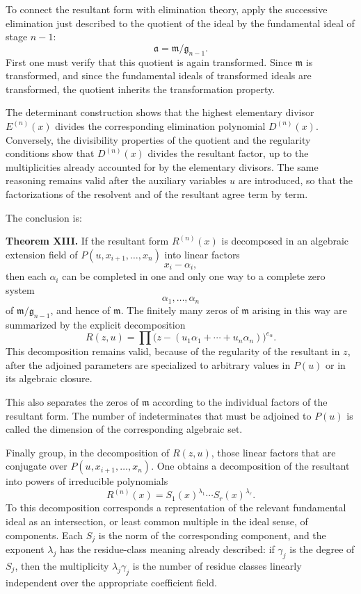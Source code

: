 \documentclass[12pt]{article}
\begin{document}
To connect the resultant form with elimination theory, apply the successive elimination just described to the quotient of the ideal by the fundamental ideal of stage $n-1$:
\[
  \mathfrak a=\mathfrak m/\mathfrak g_{n-1}.
\]
First one must verify that this quotient is again transformed. Since $\mathfrak m$ is transformed, and since the fundamental ideals of transformed ideals are transformed, the quotient inherits the transformation property.

The determinant construction shows that the highest elementary divisor $E^{(n)}(x)$ divides the corresponding elimination polynomial $D^{(n)}(x)$. Conversely, the divisibility properties of the quotient and the regularity conditions show that $D^{(n)}(x)$ divides the resultant factor, up to the multiplicities already accounted for by the elementary divisors. The same reasoning remains valid after the auxiliary variables $u$ are introduced, so that the factorizations of the resolvent and of the resultant agree term by term.

The conclusion is:

\textbf{Theorem XIII.} If the resultant form $R^{(n)}(x)$ is decomposed in an algebraic extension field of $P(u,x_{i+1},\ldots,x_n)$ into linear factors
\[
  x_i-\alpha_i,
\]
then each $\alpha_i$ can be completed in one and only one way to a complete zero system
\[
  \alpha_1,
\ldots,\alpha_n
\]
of $\mathfrak m/\mathfrak g_{n-1}$, and hence of $\mathfrak m$. The finitely many zeros of $\mathfrak m$ arising in this way are summarized by the explicit decomposition
\begin{equation}
  R(z,u)=\prod\bigl(z-(u_1\alpha_1+
\cdots+u_n\alpha_n)\bigr)^{e_\alpha}.           \tag{37}
\end{equation}
This decomposition remains valid, because of the regularity of the resultant in $z$, after the adjoined parameters are specialized to arbitrary values in $P(u)$ or in its algebraic closure.

This also separates the zeros of $\mathfrak m$ according to the individual factors of the resultant form. The number of indeterminates that must be adjoined to $P(u)$ is called the dimension of the corresponding algebraic set.

Finally group, in the decomposition of $R(z,u)$, those linear factors that are conjugate over $P(u,x_{i+1},\ldots,x_n)$. One obtains a decomposition of the resultant into powers of irreducible polynomials
\[
  R^{(n)}(x)=S_1(x)^{\lambda_1}\cdots S_r(x)^{\lambda_r}.
\]
To this decomposition corresponds a representation of the relevant fundamental ideal as an intersection, or least common multiple in the ideal sense, of components. Each $S_j$ is the norm of the corresponding component, and the exponent $\lambda_j$ has the residue-class meaning already described: if $\gamma_j$ is the degree of $S_j$, then the multiplicity $\lambda_j\gamma_j$ is the number of residue classes linearly independent over the appropriate coefficient field.
\end{document}
